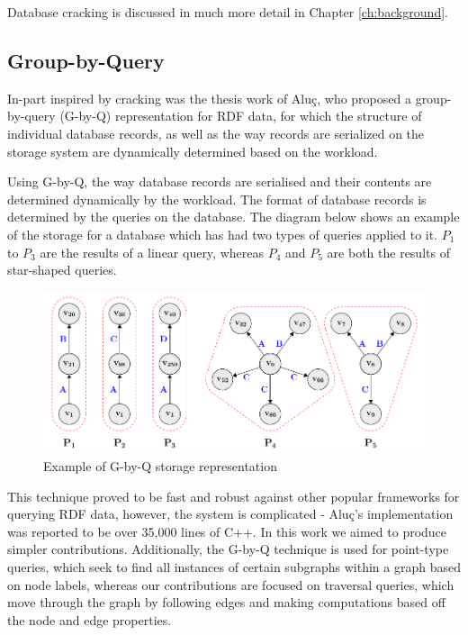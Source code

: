 Database cracking is discussed in much more detail in Chapter \ref{ch:background}.

\subsection{Group-by-Query}

In-part inspired by cracking was the thesis work of Aluç, who proposed a group-by-query (G-by-Q) representation for RDF data, for which the structure of individual database records, as well as the way records are serialized on the storage system are dynamically determined based on the workload. 

Using G-by-Q, the way database records are serialised and their contents are determined dynamically by the workload. The format of database records is determined by the queries on the database. The diagram below shows an example of the storage for a database which has had two types of queries applied to it. $P_{1}$ to $P_{3}$ are the results of a linear query, whereas $P_{4}$ and $P_{5}$ are both the results of star-shaped queries.

\begin{figure}[h]
  \includegraphics[width=\textwidth]{g_by_q_img}
  \caption{Example of G-by-Q storage representation}
  \label{fig:g_by_q_img}
\end{figure}

This technique proved to be fast and robust against other popular frameworks for querying RDF data, however, the system is complicated - Aluç's implementation was reported to be over 35,000 lines of C++. In this work we aimed to produce simpler contributions. Additionally, the G-by-Q technique is used for point-type queries, which seek to find all instances of certain subgraphs within a graph based on node labels, whereas our contributions are focused on traversal queries, which move through the graph by following edges and making computations based off the node and edge properties.

